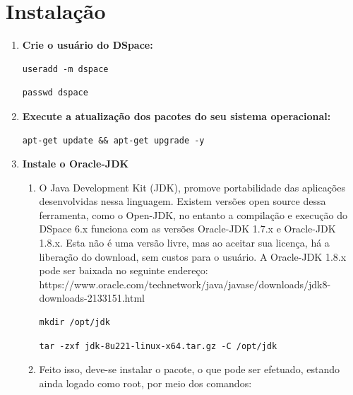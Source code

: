 \documentclass[12pt,hidelinks]{article}
\begin{document}
\newpage
\section{Instalação}
\newpage
\begin{enumerate}
    
    \item \textbf{Crie o usuário do DSpace:} 
    
        \begin{verbatim}
useradd -m dspace
        \end{verbatim}
    
        \begin{verbatim}
passwd dspace
        \end{verbatim}
    
   
    \item \textbf{Execute a atualização dos pacotes do seu sistema operacional:} 
    
        \begin{verbatim}
apt-get update && apt-get upgrade -y
        \end{verbatim}
   
    \item \textbf{Instale o Oracle-JDK}
        \begin{enumerate}
            \item O Java Development Kit (JDK), promove portabilidade das aplicações desenvolvidas nessa linguagem. Existem versões open source dessa ferramenta, como o Open-JDK, no entanto a compilação e execução do DSpace 6.x funciona com as versões Oracle-JDK 1.7.x e Oracle-JDK 1.8.x. Esta não é uma versão livre, mas ao aceitar sua licença, há a liberação do download, sem custos para o usuário. A Oracle-JDK 1.8.x pode ser baixada no seguinte endereço:
            \singlespacing
            https://www.oracle.com/technetwork/java/javase/downloads/jdk8-downloads-2133151.html
            
            \begin{verbatim}
mkdir /opt/jdk
        \end{verbatim}
        
        \begin{verbatim}
tar -zxf jdk-8u221-linux-x64.tar.gz -C /opt/jdk
        \end{verbatim}
        
        \item Feito isso, deve-se instalar o pacote, o que pode ser efetuado, estando ainda logado como root, por meio dos comandos:
        

\end{enumerate}
\end{enumerate}
\end{document}
